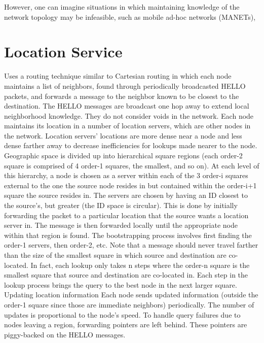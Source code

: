 \documentclass[conference]{IEEEtran}
\begin{document}
However, one can imagine situations in which maintaining knowledge of the network topology may be infeasible, such as mobile ad-hoc networks (MANETs), 



\section{Location Service}
\cite{Li:2000:SLS:345910.345931}Uses a routing technique similar to Cartesian routing in which each node maintains a list of neighbors, found through periodically broadcasted HELLO packets, and forwards a message to the neighbor known to be closest to the destination.
The HELLO messages are broadcast one hop away to extend local neighborhood knowledge.
They do not consider voids in the network.
Each node maintains its location in a number of location servers, which are other nodes in the network.
Location servers' locations are more dense near a node and less dense farther away to decrease inefficiencies for lookups made nearer to the node.
Geographic space is divided up into hierarchical square regions (each order-2 square is comprised of 4 order-1 squares, the smallest, and so on).
At each level of this hierarchy, a node is chosen as a server within each of the 3 order-i squares external to the one the source node resides in but contained within the order-i+1 square the source resides in. 
The servers are chosen by having an ID closest to the source's, but greater (the ID space is circular).
This is done by initially forwarding the packet to a particular location that the source wants a location server in.
The message is then forwarded locally until the appropriate node within that region is found.
The bootstrapping process involves first finding the order-1 servers, then order-2, etc.
Note that a message should never travel farther than the size of the smallest square in which source and destination are co-located.
In fact, each lookup only takes n steps where the order-n square is the smallest square that source and destination are co-located in.   
Each step in the lookup process brings the query to the best node in the next larger square.          
Updating location information        
Each node sends updated information (outside the order-1 square since those are immediate neighbors) periodically.
The number of updates is proportional to the node's speed.
To handle query failures due to nodes leaving a region, forwarding pointers are left behind.
These pointers are piggy-backed on the HELLO messages.
\end{document}
